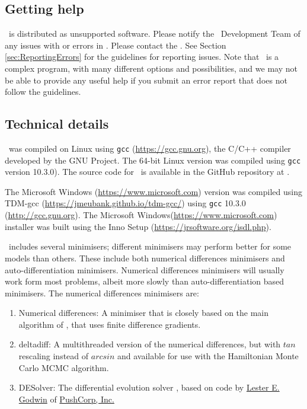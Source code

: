 \subsection{Getting help}

\CNAME\ is distributed as unsupported software. Please notify the \CNAME\ Development Team of any issues with or errors in \CNAME. Please contact the \emaillink. See Section \ref{sec:ReportingErrors} for the guidelines for reporting issues. Note that \CNAME\ is a complex program, with many different options and possibilities, and we may not be able to provide any useful help if you submit an error report that does not follow the guidelines.

\subsection{Technical details}\label{sec:TechnicalDetails}

\CNAME\ was compiled on Linux using \texttt{gcc} (\url{https://gcc.gnu.org}), the C/C++ compiler developed by the GNU Project. The 64-bit Linux  version was compiled using \texttt{gcc} version 10.3.0). The source code for \CNAME\ is available in the GitHub repository at \github.

The Microsoft Windows (\url{https://www.microsoft.com}) version was compiled using TDM-gcc (\url{https://jmeubank.github.io/tdm-gcc/}) using \texttt{gcc} 10.3.0 (\url{http://gcc.gnu.org}). The Microsoft Windows(\url{https://www.microsoft.com}) installer was built using the Inno Setup (\url{https://jrsoftware.org/isdl.php}).

\CNAME\ includes several minimisers; different minimisers may perform better for some models than others. These include both numerical differences minimisers and auto-differentiation minimisers. Numerical differences minimisers will usually work form most problems, albeit more slowly than auto-differentiation based minimisers. The numerical differences minimisers are:

\begin{enumerate}
\item Numerical differences: A minimiser that is closely based on the main algorithm of \cite{779}, that uses finite difference gradients.
\item deltadiff: A multithreaded version of the numerical differences, but with $tan$ rescaling instead of $arcsin$ and available for use with the Hamiltonian Monte Carlo MCMC algorithm.
\item DESolver: The differential evolution solver \citep{1442}, based on code by \href{mailto:<godwin@pushcorp.com>}{Lester E. Godwin} of \href{http://www.pushcorp.com}{PushCorp, Inc.}
\end{enumerate}

